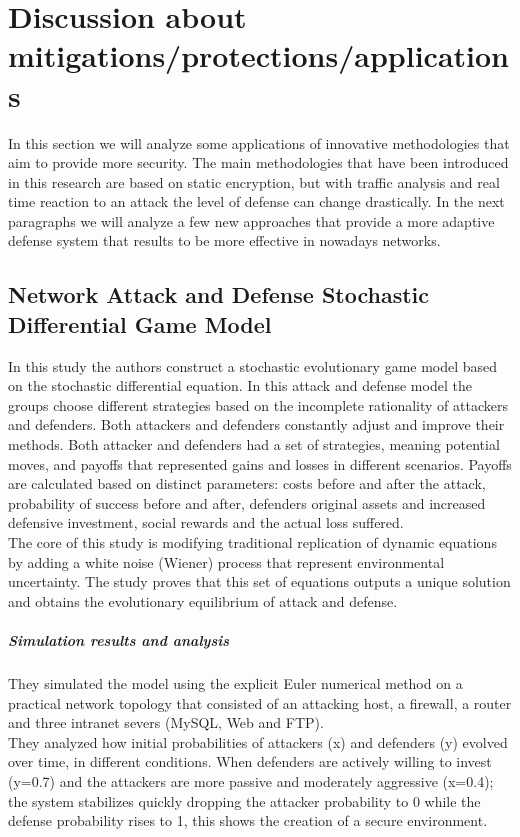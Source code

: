 \section{Discussion about mitigations/protections/applications}
In this section we will analyze some applications of innovative methodologies that aim to provide more security.
The main methodologies that have been introduced in this research are based on static encryption, but with traffic analysis and real time reaction to an attack the level of defense can change drastically. 
In the next paragraphs we will analyze a few new approaches that provide a more adaptive defense system that results to be more effective in nowadays networks.

\subsection{Network Attack and Defense Stochastic Differential Game Model}
In this study \cite{https://doi.org/10.1155/2020/3417039} the authors construct a stochastic evolutionary game model based on the stochastic differential equation. 
In this attack and defense model the groups choose different strategies based on the incomplete rationality of attackers and defenders. Both attackers and defenders constantly adjust and improve their methods. 
Both attacker and defenders had a set of strategies, meaning potential moves, and payoffs that represented gains and losses in different scenarios. Payoffs are calculated based on distinct parameters: costs before and after the attack, probability of success before and after, defenders original assets and increased defensive investment, social rewards and the actual loss suffered.
\\The core of this study is modifying traditional replication of dynamic equations by adding a white noise (Wiener) process that represent environmental uncertainty. The study proves that this set of equations outputs a unique solution and obtains the evolutionary equilibrium of attack and defense.
\subparagraph{Simulation results and analysis} They simulated the model using the explicit Euler numerical method on a practical network topology that consisted of an attacking host, a firewall, a router and three intranet severs (MySQL, Web and FTP). 
\\They analyzed how initial probabilities of attackers (x) and defenders (y) evolved over time, in different conditions. 
When defenders are actively willing to invest (y=0.7) and the attackers are more passive and moderately aggressive (x=0.4); the system stabilizes quickly dropping the attacker probability to 0 while the defense probability rises to 1, this shows the creation of a secure environment.

